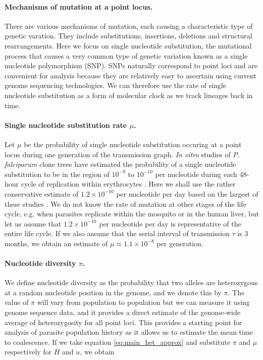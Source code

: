 \documentclass[_main.tex]{subfiles}
\begin{document}
\paragraph{Mechanisms of mutation at a point locus.} There are various mechanisms of mutation, each causing a characteristic type of genetic varation.  They include substitutions, insertions, deletions and structural rearrangements.  Here we focus on single nucleotide substitution, the mutational process that causes a very common type of genetic variation known as a single nucleotide polymorphism (SNP).  SNPs naturally correspond to point loci and are convenient for analysis because they are relatively easy to ascertain using current genome sequencing technologies.  We can therefore use the rate of single nucleotide substitution as a form of molecular clock as we track lineages back in time.

\paragraph{Single nucleotide substitution rate $\mu$.}  Let $\mu$ be the probability of single nucleotide substitution occuring at a point locus during one generation of the transmission graph.  \textit{In vitro} studies of \textit{P. falciparum} clone trees have estimated the probability of a single nucleotide substitution to be in the region of $10^{-9}$ to $10^{-10}$ per nucleotide during each 48-hour cycle of replication within erythrocytes \cite{Bopp2013,Claessens2014,Hamilton2016}.  Here we shall use the rather conservative estimate of $1.2 \times 10^{-10}$ per nucleotide per day based on the largest of these studies \cite{Hamilton2016}.  We do not know the rate of mutation at other stages of the life cycle, e.g. when parasites replicate within the mosquito or in the human liver, but let us assume that $1.2 \times 10^{-10}$ per nucleotide per day is representative of the entire life cycle.  If we also assume that the serial interval of transmission $\tau$ is 3 months, we obtain an estimate of $\mu \approx 1.1 \times 10^{-8}$ per generation.  

\paragraph{Nucleotide diversity $\pi$.}  We define nucleotide diversity as the probability that two alleles are heterozygous at a random nucleotide position in the genome, and we denote this by $\pi$.  The value of $\pi$ will vary from population to population but we can measure it using genome sequence data, and it provides a direct estimate of the genome-wide average of heterozygosity for all point loci.  This provides a starting point for analysis of parasite population history as it allows us to estimate the mean time to coalescence.  If we take equation \ref{eq:main_het_approx} and substitute $\pi$ and $\mu$ respectively for $H$ and $u$, we obtain
\end{document}
